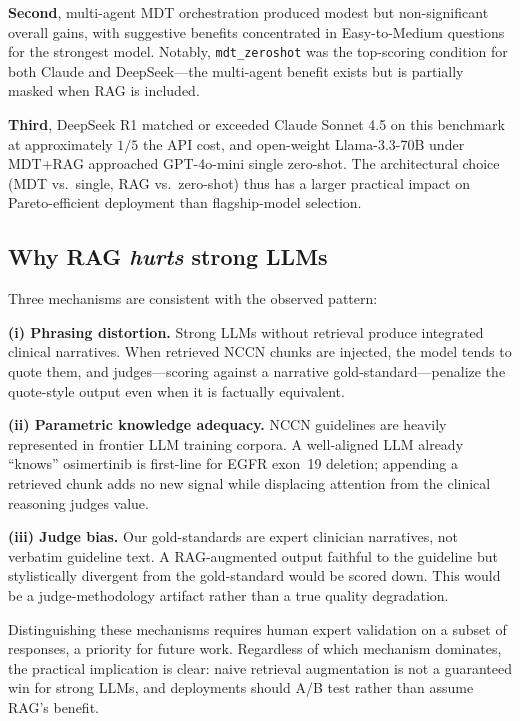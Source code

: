 \documentclass[final, 11pt, 3p]{elsarticle}
\begin{document}
\textbf{Second}, multi-agent MDT orchestration produced modest but
non-significant overall gains, with suggestive benefits concentrated
in Easy-to-Medium questions for the strongest model. Notably,
\texttt{mdt\_zeroshot} was the top-scoring condition for both Claude
and DeepSeek---the multi-agent benefit exists but is partially masked
when RAG is included.

\textbf{Third}, DeepSeek R1 matched or exceeded Claude Sonnet 4.5 on
this benchmark at approximately $1/5$ the API cost, and open-weight
Llama-3.3-70B under MDT+RAG approached GPT-4o-mini single zero-shot.
The architectural choice (MDT vs.\ single, RAG vs.\ zero-shot) thus
has a larger practical impact on Pareto-efficient deployment than
flagship-model selection.

\subsection{Why RAG \emph{hurts} strong LLMs}
Three mechanisms are consistent with the observed pattern:

\textbf{(i) Phrasing distortion.} Strong LLMs without retrieval produce
integrated clinical narratives. When retrieved NCCN chunks are
injected, the model tends to quote them, and judges---scoring against
a narrative gold-standard---penalize the quote-style output even when
it is factually equivalent.

\textbf{(ii) Parametric knowledge adequacy.} NCCN guidelines are
heavily represented in frontier LLM training corpora. A well-aligned
LLM already ``knows'' osimertinib is first-line for EGFR exon~19
deletion; appending a retrieved chunk adds no new signal while
displacing attention from the clinical reasoning judges value.

\textbf{(iii) Judge bias.} Our gold-standards are expert clinician
narratives, not verbatim guideline text. A RAG-augmented output
faithful to the guideline but stylistically divergent from the
gold-standard would be scored down. This would be a judge-methodology
artifact rather than a true quality degradation.

Distinguishing these mechanisms requires human expert validation on a
subset of responses, a priority for future work. Regardless of which
mechanism dominates, the practical implication is clear: naive
retrieval augmentation is not a guaranteed win for strong LLMs, and
deployments should A/B test rather than assume RAG's benefit.
\end{document}

